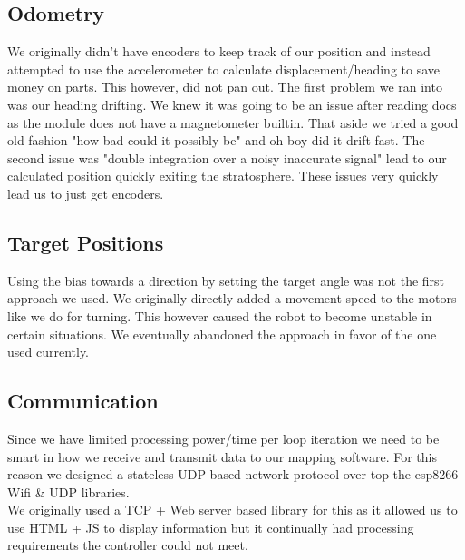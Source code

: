 \documentclass[12pt]{article}
\begin{document}
\subsection{Odometry}
We originally didn't have encoders to keep track of our position and instead attempted to use the accelerometer to calculate displacement/heading to save money on parts. This however, did not pan out. The first problem we ran into was our heading drifting. We knew it was going to be an issue after reading docs as the module does not have a magnetometer builtin. That aside we tried a good old fashion "how bad could it possibly be" and oh boy did it drift fast. The second issue was "double integration over a noisy inaccurate signal" lead to our calculated position quickly exiting the stratosphere. These issues very quickly lead us to just get encoders.

\subsection{Target Positions}
Using the bias towards a direction by setting the target angle was not the first approach we used. We originally directly added a movement speed to the motors like we do for turning. This however caused the robot to become unstable in certain situations. We eventually abandoned the approach in favor of the one used currently.

\subsection{Communication}
Since we have limited processing power/time per loop iteration we need to be smart in how we receive and transmit data to our mapping software. For this reason we designed a stateless UDP based network protocol over top the esp8266 Wifi \& UDP libraries. \cite{wifi_lib}\\

We originally used a TCP + Web server based library for this as it allowed us to use HTML + JS to display information but it continually had processing requirements the controller could not meet.
\end{document}
